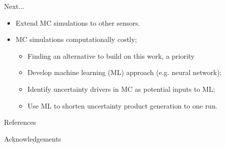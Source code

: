 \documentclass[final]{beamer}
\newlength{\onecolwid}
\begin{document}
\begin{frame}[t]
\begin{columns}[t]
\begin{column}{\onecolwid}
\begin{block}{Next...}
\begin{itemize}
\item Extend MC simulations to other sensors.
\item MC simulations computationally costly;
	\begin{itemize}
	\item Finding an alternative to build on this work, a priority
	\item Develop machine learning (ML) approach (e.g. neural network);
	\item Identify uncertainty drivers in MC as potential inputs to ML;
 	\item Use ML to shorten uncertainty product generation to one run. 
	\end{itemize}
\end{itemize}

\end{block}



\begin{block}{References}
\nocite{} %
\small{
\vspace{0.75in}}

\end{block}



\begin{block}{Acknowledgements}

\small{} \\

\end{block}



\end{column}
\end{columns}
\end{frame}
\end{document}
